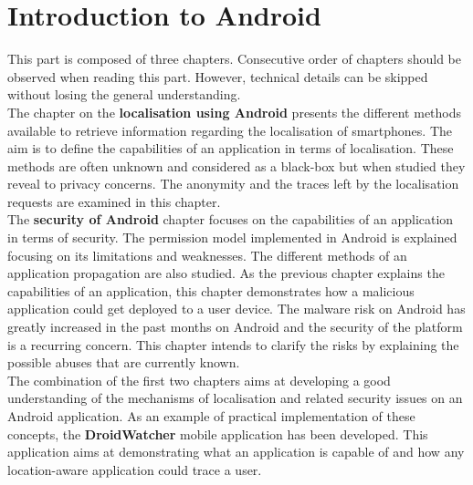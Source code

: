 \chapter{Introduction to Android}
\label{chap:andro-intro}


This part is composed of three chapters.
Consecutive order of chapters should be observed when reading this part.
However, technical details can be skipped without losing the general understanding.\\

The chapter on the \textbf{localisation using Android} presents the different methods available to retrieve information regarding the localisation of smartphones.
The aim is to define the capabilities of an application in terms of localisation.
These methods are often unknown and considered as a black-box but when studied they reveal to privacy concerns.
The anonymity and the traces left by the localisation requests are examined in this chapter.\\

The \textbf{security of Android} chapter focuses on the capabilities of an application in terms of security.
The permission model implemented in Android is explained focusing on its limitations and weaknesses.
The different methods of an application propagation are also studied.
As the previous chapter explains the capabilities of an application, this chapter demonstrates how a malicious application could get deployed to a user device.
The malware risk on Android has greatly increased in the past months on Android and the security of the platform is a recurring concern.
This chapter intends to clarify the risks by explaining the possible abuses that are currently known.\\

The combination of the first two chapters aims at developing a good understanding of the mechanisms of localisation and related security issues on an Android application.
As an example of practical implementation of these concepts, the \textbf{DroidWatcher} mobile application has been developed.
This application aims at demonstrating what an application is capable of and how any location-aware application could trace a user.

